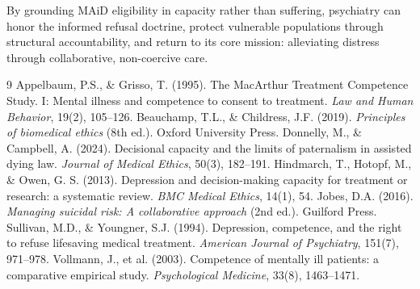 \documentclass[10pt, twocolumn, letterpaper]{article}
\begin{document}
By grounding MAiD eligibility in capacity rather than suffering, psychiatry can honor the informed refusal doctrine, protect vulnerable populations through structural accountability, and return to its core mission: alleviating distress through collaborative, non-coercive care.

\begin{thebibliography}{9}
\small
{} Appelbaum, P.S., \& Grisso, T. (1995). The MacArthur Treatment Competence Study. I: Mental illness and competence to consent to treatment. \textit{Law and Human Behavior}, 19(2), 105--126.
 Beauchamp, T.L., \& Childress, J.F. (2019). \textit{Principles of biomedical ethics} (8th ed.). Oxford University Press.
 Donnelly, M., \& Campbell, A. (2024). Decisional capacity and the limits of paternalism in assisted dying law. \textit{Journal of Medical Ethics}, 50(3), 182--191.
 Hindmarch, T., Hotopf, M., \& Owen, G. S. (2013). Depression and decision-making capacity for treatment or research: a systematic review. \textit{BMC Medical Ethics}, 14(1), 54.
 Jobes, D.A. (2016). \textit{Managing suicidal risk: A collaborative approach} (2nd ed.). Guilford Press.
 Sullivan, M.D., \& Youngner, S.J. (1994). Depression, competence, and the right to refuse lifesaving medical treatment. \textit{American Journal of Psychiatry}, 151(7), 971--978.
 Vollmann, J., et al. (2003). Competence of mentally ill patients: a comparative empirical study. \textit{Psychological Medicine}, 33(8), 1463--1471.
\end{thebibliography}
\end{document}
